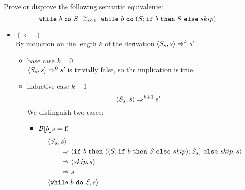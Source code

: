 \begin{exercise}{
    Prove or disprove the following semantic equivalence:
    \[ \wwhile{b}{S}\ \SOScong\ \wwhile{b}{(S;\wif{b}{S}{skip})} \]
}
\begin{itemize}
\begin{itemize}
\begin{itemize}
\begin{itemize}
\begin{gather*}
                                        k_3 + k_4 = k_2 - 2 \qquad\qquad\qquad \instr{S}{s''} \Rightarrow^{k_3} s''' \\
                                        \instr{\wwhile{b}{S}}{s'''} \Rightarrow^{k_4} s'
                                    \end{gather*}
                                    Thus by the composition lemma:
                                    \[
                                        \instr{\wif{b}{S}{skip};S_s}{s''}
                                        \Rightarrow \instr{S;S_s}{s''}
                                        \Rightarrow^* \instr{S_s}{s'''}
                                    \]
                                    Since $\instr{\wwhile{b}{S}}{s'''} \Rightarrow^{k_4} s'$ and $k_4 = k - k_1 - k_3 - 3 \leq k$ the inductive hypothesis holds and thus $\instr{S_s}{s'''} \Rightarrow^* s'$
                            \end{itemize}
                    \end{itemize}
            \end{itemize}
        \item $(\impliedby)$ \\
            By induction on the length $k$ of the derivation $\left<S_s, s\right> \Rightarrow^k s'$
            \begin{itemize}
                \item base case $k=0$ \\
                    $\left<S_s, s\right> \Rightarrow^0 s'$ is trivially false, so the implication is true.
                \item inductive case $k+1$
                    \[ \left<S_s, s\right> \Rightarrow^{k+1} s' \]
                    We distinguish two cases:
                    \begin{itemize}
                        \item $\mathcal{B} \llbracket b \rrbracket s = \text{ff}$
                            \begin{align*}
                                &\instr{S_s}{s}
                                \\&\qquad\Rightarrow \instr{\wif{b}{((S;\wif{b}{S}{skip});S_s)}{skip}}{s}
                                \\&\qquad\Rightarrow \instr{skip}{s}
                                \\&\qquad\Rightarrow s
                                \\
                                &\instr{\wwhile{b}{S}}{s}

\end{align*}
\end{itemize}
\end{itemize}
\end{itemize}
\end{exercise}
